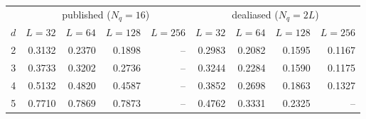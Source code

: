 \begin{tabular}{rrrrrrrrr}
\toprule
 & \multicolumn{4}{c}{published ($N_q=16$)} & \multicolumn{4}{c}{dealiased ($N_q=2L$)} \\
$d$ & $L=32$ & $L=64$ & $L=128$ & $L=256$ & $L=32$ & $L=64$ & $L=128$ & $L=256$ \\
\midrule
2 & 0.3132 & 0.2370 & 0.1898 & -- & 0.2983 & 0.2082 & 0.1595 & 0.1167 \\
3 & 0.3733 & 0.3202 & 0.2736 & -- & 0.3244 & 0.2284 & 0.1590 & 0.1175 \\
4 & 0.5132 & 0.4820 & 0.4587 & -- & 0.3852 & 0.2698 & 0.1863 & 0.1327 \\
5 & 0.7710 & 0.7869 & 0.7873 & -- & 0.4762 & 0.3331 & 0.2325 & -- \\
\bottomrule
\end{tabular}
